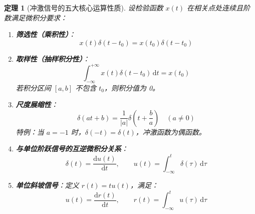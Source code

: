 \documentclass[11pt,a4paper,fontset=fandol]{ctexart}
\newtheorem{theorem}{定理}[section]
\theoremstyle{remark}
\begin{document}
\begin{theorem}[冲激信号的五大核心运算性质]
设检验函数 $x(t)$ 在相关点处连续且阶数满足微积分要求：
\begin{enumerate}
    \item \textbf{筛选性（乘积性）}：
    \begin{equation}
        x(t)\delta(t - t_0) = x(t_0)\delta(t - t_0)
    \end{equation}
    \item \textbf{取样性（抽样积分性）}：
    \begin{equation}
        \int_{-\infty}^{+\infty} x(t)\delta(t - t_0)\,\mathrm{d}t = x(t_0)
    \end{equation}
    若积分区间 $[a, b]$ 不包含 $t_0$，则积分值为 0。
    \item \textbf{尺度展缩性}：
    \begin{equation}
        \delta(at + b) = \frac{1}{|a|}\delta\left(t + \frac{b}{a}\right) \quad (a \neq 0)
    \end{equation}
    特例：当 $a = -1$ 时，$\delta(-t) = \delta(t)$，冲激函数为偶函数。
    \item \textbf{与单位阶跃信号的互逆微积分关系}：
    \begin{equation}
        \delta(t) = \frac{\mathrm{d}u(t)}{\mathrm{d}t}, \qquad u(t) = \int_{-\infty}^t \delta(\tau)\,\mathrm{d}\tau
    \end{equation}
    \item \textbf{单位斜坡信号}：定义 $r(t) = t u(t)$，满足：
    \begin{equation}
        u(t) = \frac{\mathrm{d}r(t)}{\mathrm{d}t}, \qquad r(t) = \int_{-\infty}^t u(\tau)\,\mathrm{d}\tau
    \end{equation}
\end{enumerate}

\begin{center}
\end{center}
\end{theorem}
\end{document}
